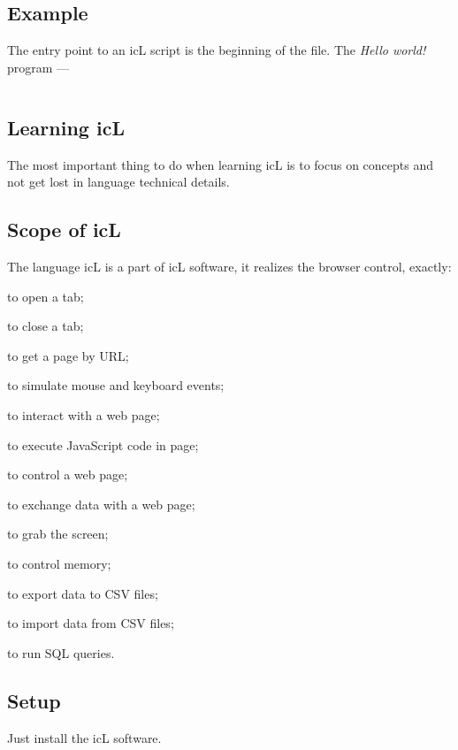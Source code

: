 \subsection{Example}

The entry point to an icL script is the beginning of the file. The \textit{Hello world!} program —
\inputminted[linenos]{icl}{../sources/helloworld.icL}

\subsection{Learning icL}

The most important thing to do when learning icL is to focus on concepts and not get lost in language technical details.

\subsection{Scope of icL}

The language icL is a part of icL software, it realizes the browser control, exactly:
\begin{icItems}
\item
	to open a tab;
\item
	to close a tab;
\item
	to get a page by URL;
\item
	to simulate mouse and keyboard events;
\item
	to interact with a web page;
\item
	to execute JavaScript code in page;
\item
	to control a web page;
\item
	to exchange data with a web page;
\item
	to grab the screen;
\item
	to control memory;
\item
	to export data to CSV files;
\item
	to import data from CSV files;
\item
	to run SQL queries.
\end{icItems}

\subsection{Setup}

Just install the icL software.
